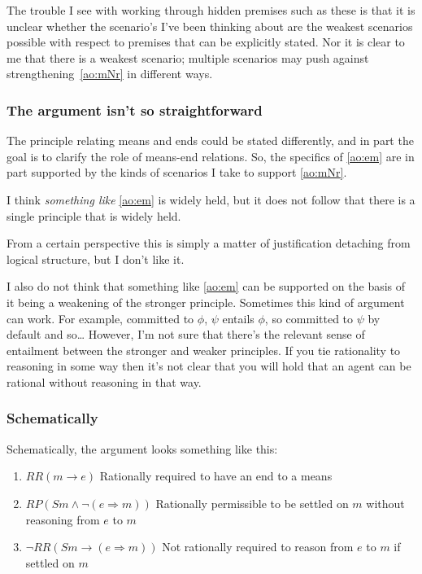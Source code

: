 \documentclass[10pt]{article}
\newcommand{\hozline}[0]{%
  \noindent\hdashrule[0.5ex][c]{\textwidth}{.1pt}{}
}
\newcommand{\hozlinedash}[0]{%
  \noindent\hdashrule[0.5ex][c]{\textwidth}{.1pt}{2.5pt}
}
\begin{document}
The trouble I see with working through hidden premises such as these is that it is unclear whether the scenario's I've been thinking about are the weakest scenarios possible with respect to premises that can be explicitly stated.
Nor it is clear to me that there is a weakest scenario; multiple scenarios may push against strengthening~\ref{ao:mNr} in different ways.

\hozlinedash

\subsubsection*{The argument isn't so straightforward}
\label{sec:argument-isnt-so}

{\color{red}
  The principle relating means and ends could be stated differently, and in part the goal is to clarify the role of means-end relations.
So, the specifics of \ref{ao:em} are in part supported by the kinds of scenarios I take to support \ref{ao:mNr}.

I think \emph{something like} \ref{ao:em} is widely held, but it does not follow that there is a single principle that is widely held.

From a certain perspective this is simply a matter of justification detaching from logical structure, but I don't like it.

I also do not think that something like \ref{ao:em} can be supported on the basis of it being a weakening of the stronger principle.
Sometimes this kind of argument can work.
For example, committed to \(\phi\), \(\psi\) entails \(\phi\), so committed to \(\psi\) by default and so\dots
However, I'm not sure that there's the relevant sense of entailment between the stronger and weaker principles.
If you tie rationality to reasoning in some way then it's not clear that you will hold that an agent can be rational without reasoning in that way.}

\hozline

\subsubsection*{Schematically}
\label{sec:schematically}

Schematically, the argument looks something like this:

\begin{enumerate}[label=\arabic*., ref=(\arabic*)]
\item\label{scm:em} \(RR(m \rightarrow e)\) \hfill Rationally required to have an end to a means
\item\label{scm:mNr} \(RP(Sm \land \lnot (e \Rightarrow m))\) \hfill Rationally permissible to be settled on \(m\) without reasoning from \(e\) to \(m\)
\item\label{scm:Nrremr} \(\lnot RR(Sm \rightarrow (e \Rightarrow m))\) \hfill Not rationally required to reason from \(e\) to \(m\) if settled on \(m\)
\end{enumerate}
\end{document}
